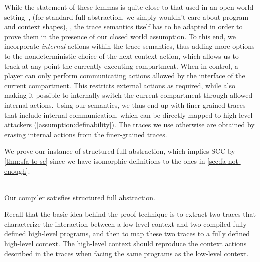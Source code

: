 \documentclass[10pt, conference, compsocconf, letterpaper, times]{IEEEtran}
\begin{document}
While the statement of these lemmas is quite close to that used in
an open world setting~\cite{JeffreyR05b,JeffreyR05},
\ifsooner
\iffull
(for standard full abstraction, we simply wouldn't care about program
and context shapes),
\else,
\fi
\fi
the trace semantics itself has to be adapted in order to prove them
in the presence of our closed world assumption.
To this end, we incorporate \emph{internal} actions within the trace
semantics, thus adding more options to the nondeterministic
choice of the next context action, which allows us to track at any
point the currently executing compartment.
When in control, a player can only perform communicating actions
allowed by the interface of the current compartment.
\ifsooner
{}
\fi
This restricts external actions as required, while also making it possible
to internally switch the current compartment through allowed internal
actions.
Using our semantics, we thus end up with finer-grained traces that
include internal communication, which can be directly mapped to
high-level attackers (\autoref{assumption:definability}).
The traces we use otherwise are obtained by erasing internal actions
from the finer-grained traces.


\label{sec:md-proof}

We prove our instance of structured full abstraction,
which implies SCC by \autoref{thm:sfa-to-sc} since we have
isomorphic definitions to the ones in \autoref{sec:fa-not-enough}.

\begin{thm}\label{thm:sfa-instance}\Coqed\\
Our compiler satisfies structured full abstraction.
\end{thm}

\ifsooner
{}

\fi



Recall that the basic idea behind the proof technique is to extract
two traces that characterize the interaction between a low-level context
and two compiled fully defined high-level programs, and then to map these
two traces to a fully defined high-level context.
The high-level context should reproduce the context actions described
in the traces when facing the same programs as the low-level context.
\end{document}
